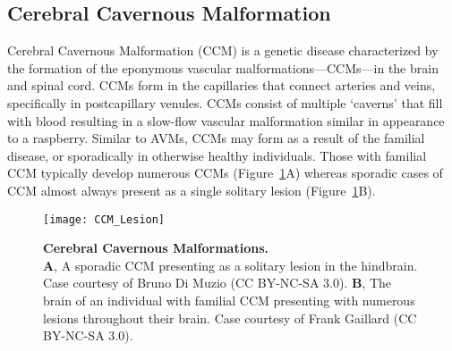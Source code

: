 \subsection{Cerebral Cavernous Malformation}
Cerebral Cavernous Malformation (CCM) is a genetic disease characterized by the formation of the eponymous vascular malformations---CCMs---in the brain and spinal cord. CCMs form in the capillaries that connect arteries and veins, specifically in postcapillary venules. CCMs consist of multiple `caverns' that fill with blood resulting in a slow-flow vascular malformation similar in appearance to a raspberry. Similar to AVMs, CCMs may form as a result of the familial disease, or sporadically in otherwise healthy individuals. Those with familial CCM typically develop numerous CCMs (Figure~\ref{CCM_Lesion}A) whereas sporadic cases of CCM almost always present as a single solitary lesion (Figure~\ref{CCM_Lesion}B). 

\begin{figure}[tbp!]
\begin{center}
\texttt{[image: CCM\_Lesion]}
\end{center}
\caption[Cerebral Cavernous Malformations.] {\textbf{Cerebral Cavernous Malformations.} \\ \textbf{A},  A sporadic CCM presenting as a solitary lesion in the hindbrain. Case courtesy of Bruno Di Muzio (CC BY-NC-SA 3.0). \textbf{B}, The brain of an individual with familial CCM presenting with numerous lesions throughout their brain. Case courtesy of Frank Gaillard (CC BY-NC-SA 3.0).}


\label{CCM_Lesion}
\end{figure}


